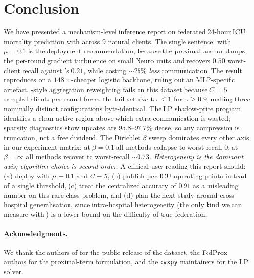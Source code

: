 \section{Conclusion}
\label{sec:conclusion}

We have presented a mechanism-level inference report on federated 24-hour ICU
mortality prediction with \mimic{} across $9$ natural clients. The single
sentence: \fedprox{} with $\mu \!=\! 0.1$ is the deployment recommendation,
because the proximal anchor damps the per-round gradient turbulence on small
Neuro units and recovers $0.50$ worst-client recall against \fedavg{}'s
$0.21$, while costing $\sim 25\%$ \emph{less} communication. The result
reproduces on a $148\!\times$-cheaper logistic backbone, ruling out an
MLP-specific artefact. \cvar{}-style aggregation reweighting fails on this
dataset because $C\!=\!5$ sampled clients per round forces the tail-set size
to $\leq 1$ for $\alpha\!\geq\!0.9$, making three nominally distinct
configurations byte-identical. The LP shadow-price program identifies a
clean active region above which extra communication is wasted; sparsity
diagnostics show updates are $95.8$--$97.7\%$ dense, so any compression is
truncation, not a free dividend. The Dirichlet $\beta$ sweep dominates every
other axis in our experiment matrix: at $\beta\!=\!0.1$ all methods collapse
to worst-recall $0$; at $\beta\!=\!\infty$ all methods recover to worst-recall
$\sim 0.73$. \emph{Heterogeneity is the dominant axis; algorithm choice is
second-order.} A clinical user reading this report should: (a) deploy
\fedprox{} with $\mu\!=\!0.1$ and $C\!=\!5$, (b) publish per-ICU operating
points instead of a single threshold, (c) treat the centralized accuracy of
$0.91$ as a misleading number on this rare-class problem, and (d) plan the
next study around cross-hospital generalisation, since intra-hospital
heterogeneity (the only kind we can measure with \mimic{}) is a lower
bound on the difficulty of true federation.

\paragraph{Acknowledgments.} We thank the authors of \mimic{} for the
public release of the dataset, the FedProx authors for the proximal-term
formulation, and the \texttt{cvxpy} maintainers for the LP solver.
